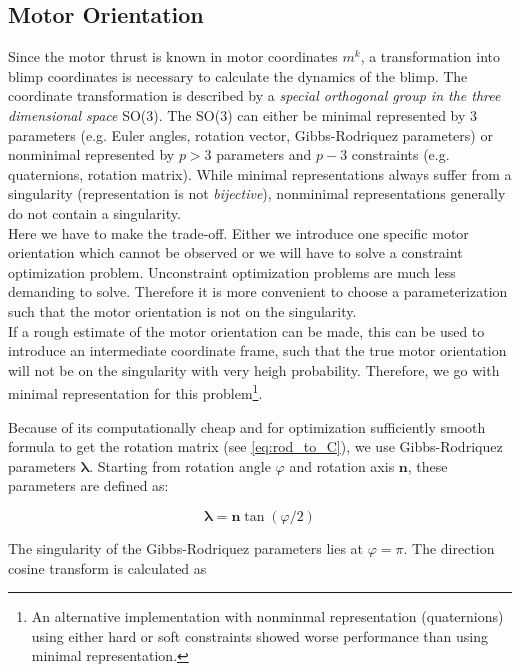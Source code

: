 \subsection{Motor Orientation}
\label{sub:par_orientation}
Since the motor thrust is known in motor coordinates $m^k$, a transformation into blimp coordinates is necessary to calculate the dynamics of the blimp.
The coordinate transformation is described by a \textit{special orthogonal group in the three dimensional space} SO(3).
The SO(3) can either be minimal represented by $3$ parameters 
(e.g. Euler angles, rotation vector, Gibbs-Rodriquez parameters) 
or nonminimal represented by $p>3$ parameters and $p-3$ constraints 
(e.g. quaternions, rotation matrix).
While minimal representations always suffer from a singularity (representation is not \textit{bijective}), nonminimal representations generally do not contain a singularity.
\\

Here we have to make the trade-off. Either we introduce one specific motor orientation which cannot be observed or we will have to solve a constraint optimization problem.
Unconstraint optimization problems are much less demanding to solve.
Therefore it is more convenient to choose a parameterization such that the motor orientation is not on the singularity.\\
If a rough estimate of the motor orientation can be made, this can be used to introduce an intermediate coordinate frame, such that the true motor orientation will not be on the singularity with very heigh probability.
Therefore, we go with minimal representation for this problem\footnote{
An alternative implementation with nonminmal representation (quaternions) using either hard or soft constraints showed worse performance than using minimal representation.
}.

Because of its computationally cheap and for optimization sufficiently smooth formula to get the rotation matrix (see \cref{eq:rod_to_C}), we use Gibbs-Rodriquez parameters $\boldsymbol{\lambda}$. Starting from rotation angle $\varphi$ and rotation axis $\mathbf{n}$, these parameters are defined as:

\begin{equation}
\boldsymbol{\lambda} = \mathbf{n} \tan(\varphi/2) 
\end{equation}

The singularity of the Gibbs-Rodriquez parameters lies at $\varphi = \pi$. 
The direction cosine transform is calculated as

